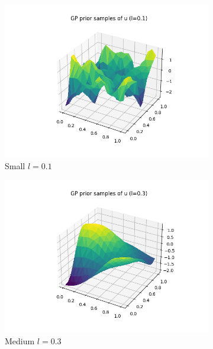 \documentclass[]{article}
\begin{document}
\begin{figure}[!h]
	\centering
	\begin{subfigure}{0.32\linewidth}
		\includegraphics[width=\linewidth]{u-small.png}
		\caption{Small $l=0.1$}
	\end{subfigure}
	\begin{subfigure}{0.32\linewidth}
		\includegraphics[width=\linewidth]{u-med.png}
		\caption{Medium $l=0.3$}
	\end{subfigure}
	\begin{subfigure}{0.32\linewidth}

\end{subfigure}
\end{figure}
\end{document}
